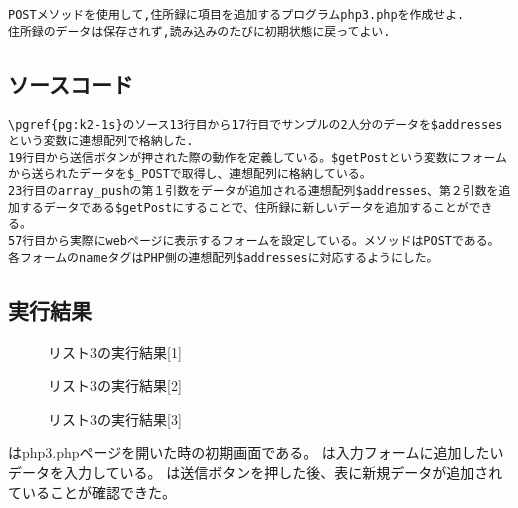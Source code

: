 \documentclass[a4j,10pt]{jsarticle}
\begin{document}
\begin{verbatim}
POSTメソッドを使用して,住所録に項目を追加するプログラムphp3.phpを作成せよ.
住所録のデータは保存されず,読み込みのたびに初期状態に戻ってよい.
\end{verbatim}
\subsection{ソースコード}


\begin{verbatim}
\pgref{pg:k2-1s}のソース13行目から17行目でサンプルの2人分のデータを$addressesという変数に連想配列で格納した.
19行目から送信ボタンが押された際の動作を定義している。$getPostという変数にフォームから送られたデータを$_POSTで取得し、連想配列に格納している。
23行目のarray_pushの第１引数をデータが追加される連想配列$addresses、第２引数を追加するデータである$getPostにすることで、住所録に新しいデータを追加することができる。
57行目から実際にwebページに表示するフォームを設定している。メソッドはPOSTである。
各フォームのnameタグはPHP側の連想配列$addressesに対応するようにした。

\end{verbatim}
\subsection{実行結果}

\begin{figure}[H]
  \centering
  \caption{リスト3の実行結果[1]}
\label{fig:fig3}
\end{figure}

\begin{figure}[H]
  \centering
  \caption{リスト3の実行結果[2]}
\label{fig:fig4}
\end{figure}

\begin{figure}[H]
  \centering
  \caption{リスト3の実行結果[3]}
\label{fig:fig5}
\end{figure}

はphp3.phpページを開いた時の初期画面である。
は入力フォームに追加したいデータを入力している。
は送信ボタンを押した後、表に新規データが追加されていることが確認できた。
\end{document}
